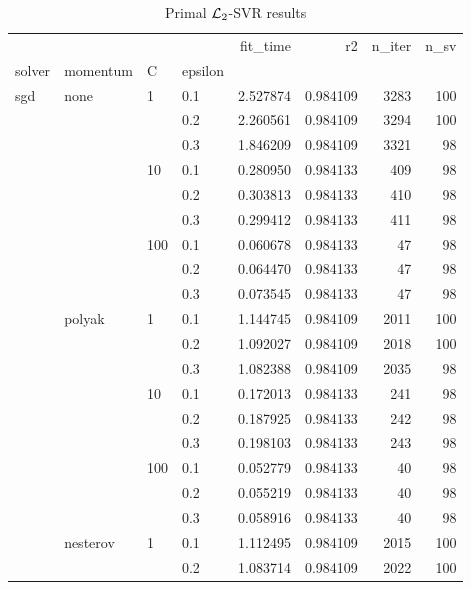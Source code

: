 \begin{table}[H]
\centering
\caption{Primal $\protect \mathcal{L}_2$-SVR results}
\label{primal_l2_svr_cv_results}
\begin{tabular}{llllrrrr}
\toprule
          &   &     &     &  fit\_time &        r2 &  n\_iter &  n\_sv \\
solver & momentum & C & epsilon &           &           &         &       \\
\midrule
sgd & none & 1   & 0.1 &  2.527874 &  0.984109 &    3283 &   100 \\
          &   &     & 0.2 &  2.260561 &  0.984109 &    3294 &   100 \\
          &   &     & 0.3 &  1.846209 &  0.984109 &    3321 &    98 \\
          &   & 10  & 0.1 &  0.280950 &  0.984133 &     409 &    98 \\
          &   &     & 0.2 &  0.303813 &  0.984133 &     410 &    98 \\
          &   &     & 0.3 &  0.299412 &  0.984133 &     411 &    98 \\
          &   & 100 & 0.1 &  0.060678 &  0.984133 &      47 &    98 \\
          &   &     & 0.2 &  0.064470 &  0.984133 &      47 &    98 \\
          &   &     & 0.3 &  0.073545 &  0.984133 &      47 &    98 \\
          & polyak & 1   & 0.1 &  1.144745 &  0.984109 &    2011 &   100 \\
          &   &     & 0.2 &  1.092027 &  0.984109 &    2018 &   100 \\
          &   &     & 0.3 &  1.082388 &  0.984109 &    2035 &    98 \\
          &   & 10  & 0.1 &  0.172013 &  0.984133 &     241 &    98 \\
          &   &     & 0.2 &  0.187925 &  0.984133 &     242 &    98 \\
          &   &     & 0.3 &  0.198103 &  0.984133 &     243 &    98 \\
          &   & 100 & 0.1 &  0.052779 &  0.984133 &      40 &    98 \\
          &   &     & 0.2 &  0.055219 &  0.984133 &      40 &    98 \\
          &   &     & 0.3 &  0.058916 &  0.984133 &      40 &    98 \\
          & nesterov & 1   & 0.1 &  1.112495 &  0.984109 &    2015 &   100 \\
          &   &     & 0.2 &  1.083714 &  0.984109 &    2022 &   100 \\

\end{tabular}
\end{table}
